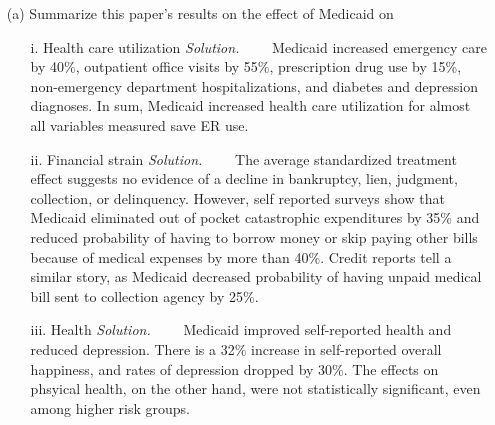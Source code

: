 \documentclass[
]{article}
\begin{document}
\begin{enumerate}

\item[(a)] Summarize this paper’s results on the effect of Medicaid on
\begin{enumerate}

\item[i.] Health care utilization
\newline
\newline
\textit{Solution.}\newline
    Medicaid increased emergency care by 40\%, outpatient office visits by 55\%, prescription drug use by 15\%, non-emergency department hospitalizations, and diabetes and depression diagnoses. In sum, Medicaid increased health care utilization for almost all variables measured save ER use. 

\item[ii.] Financial strain
\newline
\newline
\textit{Solution.}\newline
    The average standardized treatment effect suggests no evidence of a decline in bankruptcy, lien, judgment, collection, or delinquency. However, self reported surveys show that Medicaid eliminated out of pocket catastrophic expenditures by 35\% and reduced probability of having to borrow money or skip paying other bills because of medical expenses by more than 40\%. Credit reports tell a similar story, as Medicaid decreased probability of having unpaid medical bill sent to collection agency by 25\%. 

\item[iii.] Health
\newline
\newline
\textit{Solution.}\newline
    Medicaid improved self-reported health and reduced depression. There is a 32\% increase in self-reported overall happiness, and rates of depression dropped by 30\%. The effects on phsyical health, on the other hand, were not statistically significant, even among higher risk groups. 

\end{enumerate}


\end{enumerate}
\end{document}
